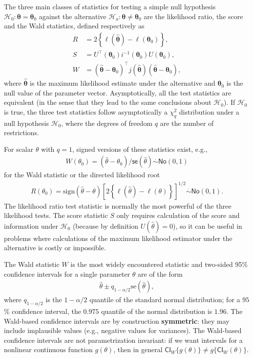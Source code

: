 \documentclass[
  11pt,
  letterpaper,
]{book}
\theoremstyle{definition}
\theoremstyle{definition}
\theoremstyle{definition}
\theoremstyle{remark}
\begin{document}
The three main classes of statistics for testing a simple null hypothesis \(\mathscr{H}_0: \boldsymbol{\theta}=\boldsymbol{\theta}_0\) against the alternative \(\mathscr{H}_a: \boldsymbol{\theta} \neq \boldsymbol{\theta}_0\) are the likelihood ratio, the score and the Wald statistics, defined respectively as
\begin{align*}
 R &= 2 \left\{ \ell(\widehat{\boldsymbol{\theta}})-\ell(\boldsymbol{\theta}_0)\right\}, \\
 S &= U^\top(\boldsymbol{\theta}_0)i^{-1}(\boldsymbol{\theta}_0)U(\boldsymbol{\theta}_0), \\
 W &= (\widehat{\boldsymbol{\theta}}-\boldsymbol{\theta}_0)^\top j(\widehat{\boldsymbol{\theta}})(\widehat{\boldsymbol{\theta}}-\boldsymbol{\theta}_0),
\end{align*}
where \(\widehat{\boldsymbol{\theta}}\) is the maximum likelihood estimate under the alternative and \(\boldsymbol{\theta}_0\) is the null value of the parameter vector. Asymptotically, all the test statistics are equivalent (in the sense that they lead to the same conclusions about \(\mathscr{H}_0\)).
If \(\mathscr{H}_0\) is true, the three test statistics follow asymptotically a \(\chi^2_q\) distribution under a null hypothesis \(\mathscr{H}_0\), where the degrees of freedom \(q\) are the number of restrictions.

For scalar \(\theta\) with \(q=1\), signed versions of these statistics exist, e.g., \begin{align*}
W(\theta_0)=(\widehat{\theta}-\theta_0)/\mathsf{se}(\widehat{\theta})\stackrel{\cdot}{\sim} \mathsf{No}(0,1)
\end{align*}
for the Wald statistic or the directed likelihood root
\begin{align*}
R({\theta_0}) = \mathrm{sign}(\widehat{\theta}-\theta)\left[2
\left\{\ell(\widehat{\theta})-\ell(\theta)\right\}\right]^{1/2} \stackrel{\cdot}{\sim} \mathsf{No}(0,1).
\end{align*}
The likelihood ratio test statistic is normally the most powerful of the three likelihood tests. The score statistic \(S\) only requires calculation of the score and information under \(\mathscr{H}_0\) (because by definition \(U(\widehat{\theta})=0\)), so it can be useful in problems where calculations of the maximum likelihood estimator under the alternative is costly or impossible.

The Wald statistic \(W\) is the most widely encountered statistic and two-sided 95\% confidence intervals for a single parameter \(\theta\) are of the form
\begin{align*}
\widehat{\theta} \pm q_{1-\alpha/2}\mathrm{se}(\widehat{\theta}),
\end{align*}
where \(q_{1-\alpha/2}\) is the \(1-\alpha/2\) quantile of the standard normal distribution; for a \(95\)\% confidence interval, the \(0.975\) quantile of the normal distribution is \(1.96\).
The Wald-based confidence intervals are by construction \textbf{symmetric}: they may include implausible values (e.g., negative values for variances). The Wald-based confidence intervals are not parametrization invariant: if we want intervals for a nonlinear continuous function \(g(\theta)\), then in general
\(\mathsf{CI}_{W}\{g(\theta)\} \neq g\{\mathsf{CI}_{W}(\theta)\}.\)
\end{document}
